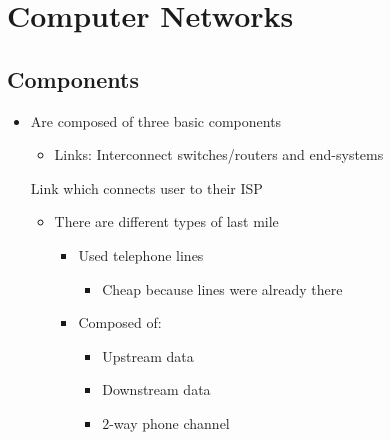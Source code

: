 
\section{Computer Networks}
\subsection{Components}
\begin{itemize}
    \item Are composed of three basic components
        \begin{itemize}
                \begin{itemize}
                    \item Send and receive data
                    \item Represent the users of a networks
                    \item Huge diversity of such devices
                \end{itemize}
             Forward data to the destination
            \item{Links:} Interconnect switches/routers and end-systems
        \end{itemize}
     Link which connects user to their ISP 
        \begin{itemize}
            \item There are different types of last mile
                    \begin{itemize}
                        \item Used telephone lines
                            \begin{itemize}
                                \item Cheap because lines were already there
                            \end{itemize}
                        \item Composed of:
                            \begin{itemize}
                                \item Upstream data
                                \item Downstream data
                                \item $2$-way phone channel
                            \end{itemize}

\end{itemize}
\end{itemize}
\end{itemize}
